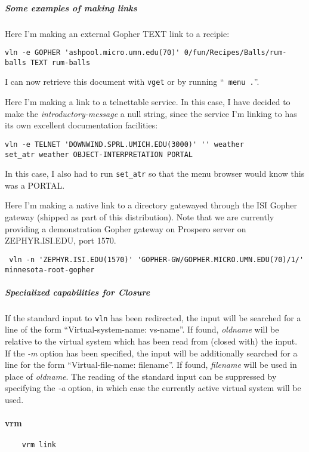 \subparagraph{Some examples of making links}

Here I'm making an external Gopher TEXT link to a recipie:
\begin{verbatim}
vln -e GOPHER 'ashpool.micro.umn.edu(70)' 0/fun/Recipes/Balls/rum-balls TEXT rum-balls
\end{verbatim}
I can now retrieve this document with {\tt vget} or by running ``{\tt
menu .}''.

Here I'm making a link to a telnettable service.  In this case, I have
decided to make the {\em introductory-message} a null string, since
the service I'm linking to has its own excellent documentation facilities:
\begin{verbatim}
vln -e TELNET 'DOWNWIND.SPRL.UMICH.EDU(3000)' '' weather
set_atr weather OBJECT-INTERPRETATION PORTAL
\end{verbatim}
In this case, I also had to run {\tt set\_atr} so that the menu
browser would know this was a {\sc PORTAL}.

Here I'm making a native link to a directory gatewayed through the ISI
Gopher gateway (shipped as part of this distribution).  Note that we are
currently providing a demonstration Gopher gateway on Prospero server
on ZEPHYR.ISI.EDU, port 1570.  

\begin{verbatim}
 vln -n 'ZEPHYR.ISI.EDU(1570)' 'GOPHER-GW/GOPHER.MICRO.UMN.EDU(70)/1/' minnesota-root-gopher
\end{verbatim}

\subparagraph{Specialized capabilities for Closure}

If the standard input to {\tt vln} has been redirected, the input will
be searched for a line of the form ``Virtual-system-name: vs-name''.
If found, {\em oldname} will be relative to the virtual system which
has been read from (closed with) the input.  If the {\em -m} option
has been specified, the input will be additionally searched for a line
for the form ``Virtual-file-name: filename''.  If found, {\em
filename} will be used in place of {\it oldname}.  The reading of the
standard input can be suppressed by specifying the {\em -a} option, in
which case the currently active virtual system will be used.

\paragraph{vrm}

\begin{verbatim}
    vrm link
\end{verbatim}


